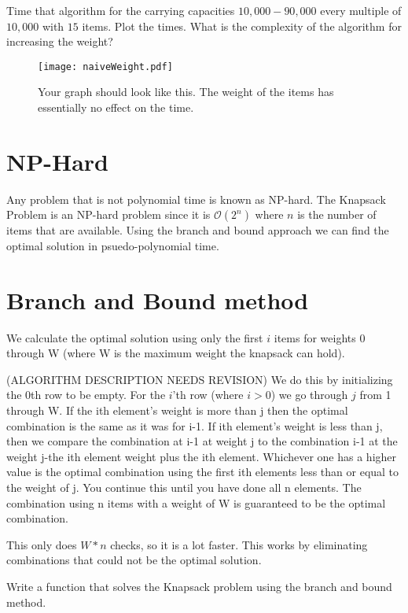 \begin{problem}
Time that algorithm for the carrying capacities $10,000-90,000$ every multiple of $10,000$ with $15$ items.
Plot the times.
What is the complexity of the algorithm for increasing the weight?

\begin{figure}[H]
\texttt{[image: naiveWeight.pdf]}
\caption{
Your graph should look like this.
The weight of the items has essentially no effect on the time.}
\end{figure}
\end{problem}

\section*{NP-Hard}

Any problem that is not polynomial time is known as NP-hard.
The Knapsack Problem is an NP-hard problem since it is $\mathcal{O}\left(2^n\right)$ where $n$ is the number of items that are available.
Using the branch and bound approach we can find the optimal solution in psuedo-polynomial time.

\section*{Branch and Bound method}

We calculate the optimal solution using only the first $i$ items for weights 0 through W (where W is the maximum weight the knapsack can hold).

(ALGORITHM DESCRIPTION NEEDS REVISION)
We do this by initializing the 0th row to be empty.
For the $i$'th row (where $i>0$) we go through $j$ from 1 through W.
If the ith element's weight is more than j then the optimal combination is the same as it was for i-1.
If ith element's weight is less than j, then we compare the combination at i-1 at weight j to the combination i-1 at the weight j-the ith element weight plus the ith element.
Whichever one has a higher value is the optimal combination using the first ith elements less than or equal to the weight of j.
You continue this until you have done all n elements.
The combination using n items with a weight of W is guaranteed to be the optimal combination.

This only does $W*n$ checks, so it is a lot faster.
This works by eliminating combinations that could not be the optimal solution.

\begin{problem}
Write a function that solves the Knapsack problem using the branch and bound method.
\end{problem}

